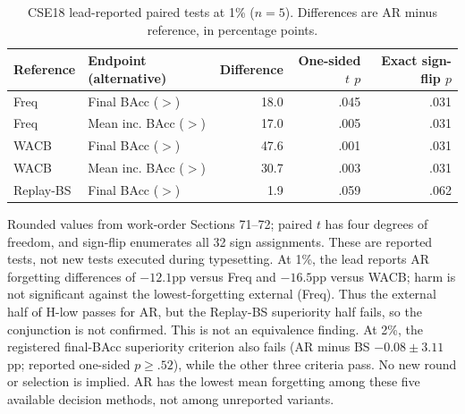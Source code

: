 \begin{table}[t]
\centering\small
\caption{CSE18 lead-reported paired tests at 1\% ($n=5$). Differences are AR minus reference, in percentage points.}\label{tab:cse-new-seed-tests}
\begin{tabular}{llrrr}
\toprule
Reference & Endpoint (alternative) & Difference & One-sided $t$ $p$ & Exact sign-flip $p$ \\
\midrule
Freq & Final BAcc ($>$) & 18.0 & .045 & .031 \\
Freq & Mean inc. BAcc ($>$) & 17.0 & .005 & .031 \\
WACB & Final BAcc ($>$) & 47.6 & .001 & .031 \\
WACB & Mean inc. BAcc ($>$) & 30.7 & .003 & .031 \\
Replay-BS & Final BAcc ($>$) & 1.9 & .059 & .062 \\
\bottomrule
\end{tabular}
\par\smallskip\begin{minipage}{.97\textwidth}\footnotesize
Rounded values from work-order Sections 71--72; paired $t$ has four degrees of freedom, and sign-flip enumerates all 32 sign assignments. These are reported tests, not new tests executed during typesetting. At 1\%, the lead reports AR forgetting differences of $-12.1$pp versus Freq and $-16.5$pp versus WACB; harm is not significant against the lowest-forgetting external (Freq). Thus the external half of H-low passes for AR, but the Replay-BS superiority half fails, so the conjunction is not confirmed. This is not an equivalence finding. At 2\%, the registered final-BAcc superiority criterion also fails (AR minus BS $-0.08\pm3.11$pp; reported one-sided $p\geq.52$), while the other three criteria pass. No new round or selection is implied. AR has the lowest mean forgetting among these five available decision methods, not among unreported variants.
\end{minipage}
\end{table}
